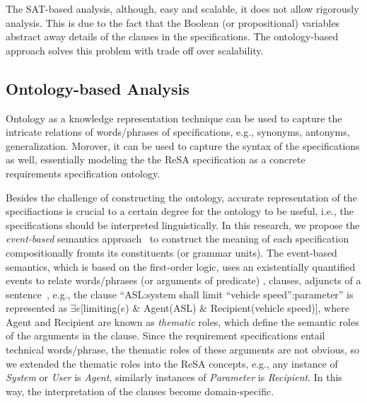 The SAT-based analysis, although, easy and scalable, it does not allow rigorously analysis. This is due to the fact that the Boolean (or propositional) variables abstract away details of the clauses in the specifications. The ontology-based approach solves this problem with trade off over scalability.

\subsection*{Ontology-based Analysis}
Ontology as a knowledge representation technique can be used to capture the intricate relations of words/phrases of specifications, e.g., synonyms, antonyms, generalization. Morover, it can be used to capture the syntax of the specifications as well, essentially modeling the the ReSA specification as a concrete requirements specification ontology. 

Besides the challenge of constructing the ontology, accurate representation of the specifiactions is crucial to a certain degree for the ontology to be useful, i.e., the specifications should be interpreted linguistically. In this research, we propose the \textit{event-based} semantics approach~\cite{Mahmud2017SpecificationLogic} to construct the meaning of each specification compositionally fromts its constituents (or grammar units). The event-based semantics, which is based on the first-order logic, uses an existentially quantified events to relate words/phrases (or arguments of predicate) , clauses, adjuncts of a sentence~\cite{Mahmud2017SpecificationLogic}, e.g., the clause ``ASL:system shall limit ``vehicle speed'':parameter'' is represented as $\exists e$[limiting($e$) \& Agent(ASL) \& Recipient(vehicle speed)], where Agent and Recipient are known as \textit{thematic} roles, which define the semantic roles of the arguments in the clause.  Since the requirement specifications entail technical words/phrase, the thematic roles of these arguments are not obvious, so we extended the thematic roles into the ReSA concepts, e.g., any instance of \textit{System} or \textit{User} is \textit{Agent}, similarly instances of \textit{Parameter} is \textit{Recipient}. In this way, the interpretation of the clauses become domain-specific.

